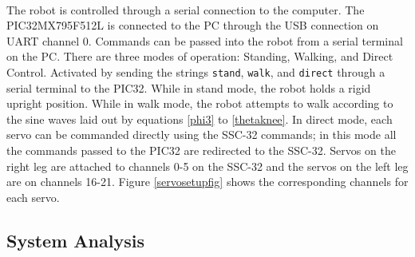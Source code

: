 \documentclass[titlepage,letterpaper,12pt]{article}
\begin{document}
\paragraph{}The robot is controlled through a serial connection to the computer.
The PIC32MX795F512L is connected to the PC through the USB connection on UART
channel 0. Commands can be passed into the robot from a serial terminal on the
PC. There are three modes of operation: Standing, Walking, and Direct
Control. Activated by sending the strings \verb!stand!, \verb!walk!, and
\verb!direct! through a serial terminal to the PIC32. While in stand mode, the
robot holds a rigid upright position. While in walk mode, the robot attempts to
walk according to the sine waves laid out by equations \ref{phi3} to
\ref{thetaknee}. In direct mode, each servo can be commanded directly using
the SSC-32 commands; in this mode all the commands passed to the PIC32 are
redirected to the SSC-32. Servos on the right leg are attached to channels 0-5
on the SSC-32 and the servos on the left leg are on channels 16-21. Figure
\ref{servosetupfig} shows the corresponding channels for each servo.

\subsection{System Analysis}
\end{document}
